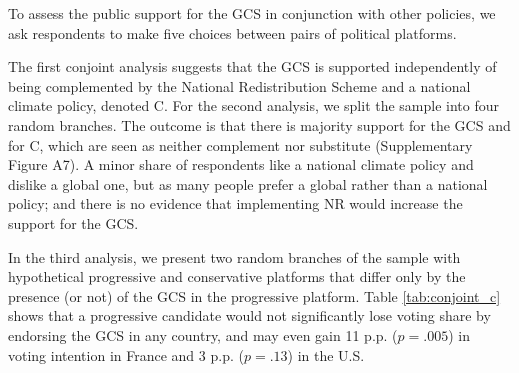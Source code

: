 To assess the public support for the GCS in conjunction with other policies, we %
ask respondents to make five choices between pairs of political platforms.

The first conjoint analysis suggests that the GCS is supported independently of being complemented by the National Redistribution Scheme and a national climate policy, denoted C.  
For the second analysis, we split the sample into four random branches. %
The outcome is that there is majority support for the GCS and for C, which are seen as neither complement nor substitute (Supplementary Figure A7). A minor share of respondents like a national climate policy and dislike a global one, but as many people prefer a global rather than a national policy; and there is no evidence that implementing NR would increase the support for the GCS.

In the third analysis, we present two random branches of the sample with hypothetical progressive and conservative platforms that differ only by the presence (or not) of the GCS in the progressive platform. Table \ref{tab:conjoint_c} shows that a progressive candidate would not significantly lose voting share by endorsing the GCS in any country, and may even gain 11 p.p. ($p = .005$) in voting intention in France and 3 p.p. ($p = .13$) in the U.S. 

